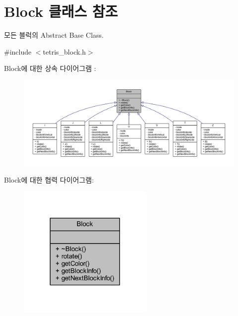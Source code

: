 \hypertarget{class_block}{}\section{Block 클래스 참조}
\label{class_block}


모든 블럭의 Abstract Base Class.  




{\ttfamily \#include $<$tetris\+\_\+block.\+h$>$}



Block에 대한 상속 다이어그램 \+: 
\nopagebreak
\begin{figure}[H]
\begin{center}
\leavevmode
\includegraphics[width=350pt]{class_block__inherit__graph}
\end{center}
\end{figure}


Block에 대한 협력 다이어그램\+:
\nopagebreak
\begin{figure}[H]
\begin{center}
\leavevmode
\includegraphics[width=185pt]{class_block__coll__graph}
\end{center}
\end{figure}
